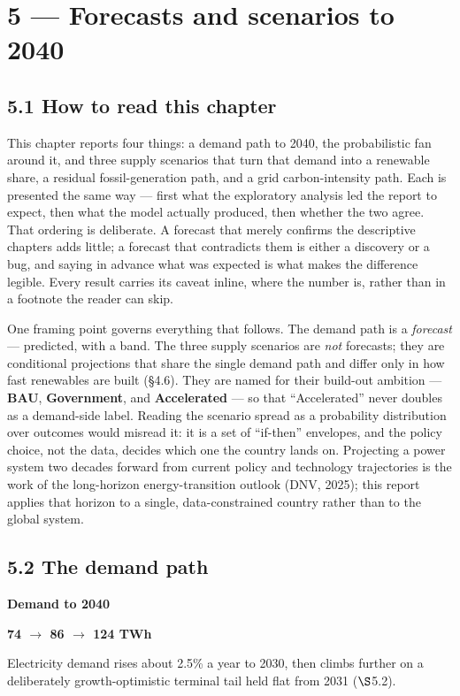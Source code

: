 \documentclass[10pt,twocolumn]{article}
\newcommand{\keystat}[3]{%
  \begin{keystatbox}%
  {\footnotesize\bfseries\color{skydeep}#1}\par\vspace{1pt}%
  {\Large\bfseries\color{navy}#2}\par\vspace{2pt}%
  {\footnotesize\color{ink}#3}%
  \end{keystatbox}}
\begin{document}
\section*{5 --- Forecasts and scenarios to 2040}

\subsection*{5.1 How to read this chapter}

This chapter reports four things: a demand path to 2040, the probabilistic fan around it, and three supply scenarios that turn that demand into a renewable share, a residual fossil-generation path, and a grid carbon-intensity path. Each is presented the same way --- first what the exploratory analysis led the report to expect, then what the model actually produced, then whether the two agree. That ordering is deliberate. A forecast that merely confirms the descriptive chapters adds little; a forecast that contradicts them is either a discovery or a bug, and saying in advance what was expected is what makes the difference legible. Every result carries its caveat inline, where the number is, rather than in a footnote the reader can skip.

One framing point governs everything that follows. The demand path is a \textit{forecast} --- predicted, with a band. The three supply scenarios are \textit{not} forecasts; they are conditional projections that share the single demand path and differ only in how fast renewables are built (\S{}4.6). They are named for their build-out ambition --- \textbf{BAU}, \textbf{Government}, and \textbf{Accelerated} --- so that ``Accelerated'' never doubles as a demand-side label. Reading the scenario spread as a probability distribution over outcomes would misread it: it is a set of ``if-then'' envelopes, and the policy choice, not the data, decides which one the country lands on. Projecting a power system two decades forward from current policy and technology trajectories is the work of the long-horizon energy-transition outlook (DNV, 2025); this report applies that horizon to a single, data-constrained country rather than to the global system.

\subsection*{5.2 The demand path}

\keystat{Demand to 2040}{74 $\rightarrow$ 86 $\rightarrow$ 124 TWh}%
{Electricity demand rises about 2.5\% a year to 2030, then climbs further on a
deliberately growth-optimistic terminal tail held flat from 2031 ($\S$5.2).}
\end{document}
